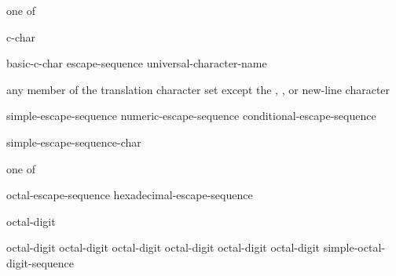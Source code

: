 \begin{bnf}
 \textnormal{one of}\br
    \quad{}\quad{}\quad{}
\end{bnf}

\begin{bnf}
\br
    c-char 
\end{bnf}

\begin{bnf}
\br
    basic-c-char\br
    escape-sequence\br
    universal-character-name
\end{bnf}

\begin{bnf}
\br
    \textnormal{any member of the translation character set except the ,}\br
    \bnfindent\textnormal{, or new-line character}
\end{bnf}

\begin{bnf}
\br
    simple-escape-sequence\br
    numeric-escape-sequence\br
    conditional-escape-sequence
\end{bnf}

\begin{bnf}
\br
    \terminal{\textbackslash} simple-escape-sequence-char
\end{bnf}

\begin{bnf}
 \textnormal{one of}\br
\end{bnf}

\begin{bnf}
\br
    octal-escape-sequence\br
    hexadecimal-escape-sequence
\end{bnf}

\begin{bnf}
\br
    octal-digit 
\end{bnf}

\begin{bnf}
\br
    \terminal{\textbackslash} octal-digit\br
    \terminal{\textbackslash} octal-digit octal-digit\br
    \terminal{\textbackslash} octal-digit octal-digit octal-digit\br
     simple-octal-digit-sequence \terminal{\}}
\end{bnf}

